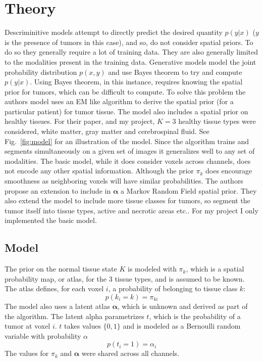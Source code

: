 \documentclass[10pt,twocolumn,letterpaper]{article}
\begin{document}
\section{Theory}

Descriminitive models attempt to directly predict the desired quantity $p(y|x)$ ($y$ is the presence of tumors in this case), and so, do not consider spatial priors. To do so they generally require a lot of training data. They are also generally limited to the modalities present in the training data. Generative models model the joint probability distribution $p(x,y)$ and use Bayes theorem to try and compute  $p(y|x)$. Using Bayes theorem, in this instance, requires knowing the spatial prior for tumors, which can be difficult to compute. To solve this problem the authors model uses an EM like algorithm to derive the spatial prior (for a particular patient) for tumor tissue. The model also includes a spatial prior on healthy tissues. For their paper, and my project, $K=3$ healthy tissue types were considered, white matter, gray matter and cerebrospinal fluid. See Fig.~\ref{fig:model} for an illustration of the model. Since the algorithm trains and segments simultaneously on a given set of images it generalizes well to any set of modalities. The basic model, while it does consider voxels across channels, does not encode any other spatial information. Although the prior $\pi_k$ does encourage smoothness as neighboring voxels will have similar probabilities. The authors propose an extension to include in $\boldsymbol{\alpha}$ a Markov Random Field spatial prior. They also extend the model to include more tissue classes for tumors, so segment the tumor itself into tissue types, active and necrotic areas etc.. For my project I only implemented the basic model.

\subsection{Model}

The prior on the normal tissue state $K$ is modeled with $\pi_k$, which is a spatial probability map, or atlas, for the 3 tissue types, and is assumed to be known. The atlas defines, for each voxel $i$, a probability of belonging to tissue class $k$:
\begin{equation}p(k_i=k)=\pi_{ki}\end{equation}
The model also uses a latent atlas $\boldsymbol{\alpha}$, which is unknown and derived as part of the algorithm. The latent alpha parametrizes $t$, which is the probability of a tumor at voxel $i$. $t$ takes values $\{0,1\}$ and is modeled as a Bernoulli random variable with probability $\alpha$
\begin{equation}p(t_i = 1)=\alpha_i\end{equation}
The values for $\pi_k$ and $\boldsymbol{\alpha}$ were shared across all channels. 
\end{document}
